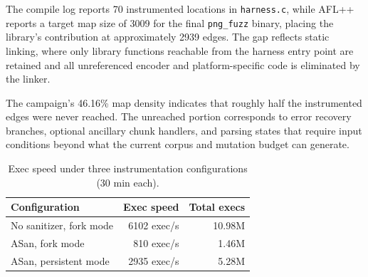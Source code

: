\documentclass[letterpaper,twocolumn,10pt]{article}
\begin{document}


The compile log reports 70 instrumented locations in \lstinline|harness.c|, while AFL++ reports a target map size of 3009 for the final \lstinline|png_fuzz| binary, placing the library's contribution at approximately 2939 edges. The gap reflects static linking, where only library functions reachable from the harness entry point are retained and all unreferenced encoder and platform-specific code is eliminated by the linker.


The campaign's 46.16\% map density indicates that roughly half the instrumented edges were never reached. The unreached portion corresponds to error recovery branches, optional ancillary chunk handlers, and parsing states that require input conditions beyond what the current corpus and mutation budget can generate.

\begin{table}[h]
\centering
\small
\begin{tabular}{lrr}
\toprule
Configuration & Exec speed & Total execs \\
\midrule
No sanitizer, fork mode   & 6102 exec/s & 10.98M \\
ASan, fork mode           &  810 exec/s &  1.46M \\
ASan, persistent mode     & 2935 exec/s &  5.28M \\
\bottomrule
\end{tabular}
\caption{Exec speed under three instrumentation configurations (30 min each).}
\label{tab:exec-speed}
\end{table}
\end{document}
